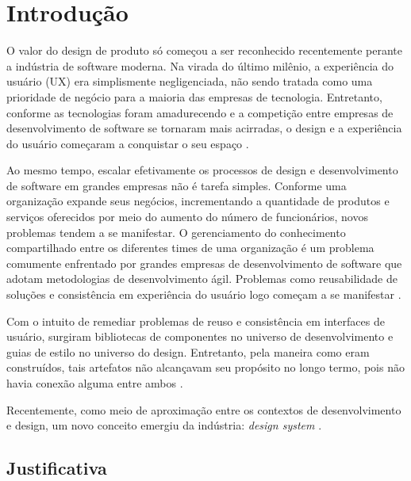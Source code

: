 
\chapter{Introdução}
\label{chap:introducao}

O valor do design de produto só começou a ser reconhecido recentemente perante a indústria de software moderna. Na virada do último milênio, a experiência do usuário (UX) era simplismente negligenciada, não sendo tratada como uma prioridade de negócio para a maioria das empresas de tecnologia. Entretanto, conforme as tecnologias foram amadurecendo e a competição entre empresas de desenvolvimento de software se tornaram mais acirradas, o design e a experiência do usuário começaram a conquistar o seu espaço \cite{ruissalo2018operating}.

Ao mesmo tempo, escalar efetivamente os processos de design e desenvolvimento de software em grandes empresas não é tarefa simples. Conforme uma organização expande seus negócios, incrementando a quantidade de produtos e serviços oferecidos por meio do aumento do número de funcionários, novos problemas tendem a se manifestar. O gerenciamento do conhecimento compartilhado entre os diferentes times de uma organização é um problema comumente enfrentado por grandes empresas de desenvolvimento de software que adotam metodologias de desenvolvimento ágil. Problemas como reusabilidade de soluções e consistência em experiência do usuário logo começam a se manifestar \cite{ruissalo2018operating}.

Com o intuito de remediar problemas de reuso e consistência em interfaces de usuário, surgiram bibliotecas de componentes no universo de desenvolvimento e guias de estilo no universo do design. Entretanto, pela maneira como eram construídos, tais artefatos não alcançavam seu propósito no longo termo, pois não havia conexão alguma entre ambos \cite{ruissalo2018operating}.

Recentemente, como meio de aproximação entre os contextos de desenvolvimento e design, um novo conceito emergiu da indústria: \textit{design system} \cite{kholmatova2017design}.

\section{Justificativa}
\label{sec:justificativa}

